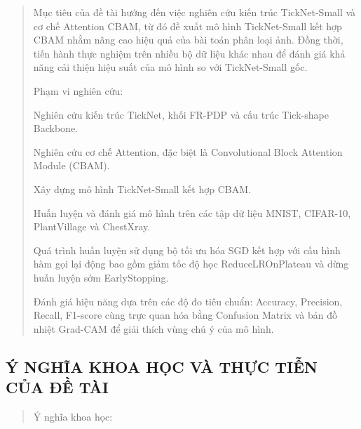 \documentclass[
]{article}
\begin{document}
\begin{quote}
Mục tiêu của đề tài hướng đến việc nghiên cứu kiến trúc TickNet-Small và
cơ chế Attention CBAM, từ đó đề xuất mô hình TickNet-Small kết hợp CBAM
nhằm nâng cao hiệu quả của bài toán phân loại ảnh. Đồng thời, tiến hành
thực nghiệm trên nhiều bộ dữ liệu khác nhau để đánh giá khả năng cải
thiện hiệu suất của mô hình so với TickNet-Small gốc.

Phạm vi nghiên cứu:

Nghiên cứu kiến trúc TickNet, khối FR-PDP và cấu trúc Tick-shape
Backbone.

Nghiên cứu cơ chế Attention, đặc biệt là Convolutional Block Attention
Module (CBAM).

Xây dựng mô hình TickNet-Small kết hợp CBAM.

Huấn luyện và đánh giá mô hình trên các tập dữ liệu MNIST, CIFAR-10,
PlantVillage và ChestXray.

Quá trình huấn luyện sử dụng bộ tối ưu hóa SGD kết hợp với cấu hình hàm
gọi lại động bao gồm giảm tốc độ học ReduceLROnPlateau và dừng huấn
luyện sớm EarlyStopping.

Đánh giá hiệu năng dựa trên các độ đo tiêu chuẩn: Accuracy, Precision,
Recall, F1-score cùng trực quan hóa bằng Confusion Matrix và bản đồ
nhiệt Grad-CAM để giải thích vùng chú ý của mô hình.
\end{quote}

\hypertarget{uxfd-nghux129a-khoa-hux1ecdc-vuxe0-thux1ef1c-tiux1ec5n-cux1ee7a-ux111ux1ec1-tuxe0i}{%
\subsection{Ý NGHĨA KHOA HỌC VÀ THỰC TIỄN CỦA ĐỀ
TÀI}\label{uxfd-nghux129a-khoa-hux1ecdc-vuxe0-thux1ef1c-tiux1ec5n-cux1ee7a-ux111ux1ec1-tuxe0i}}

\begin{quote}
Ý nghĩa khoa học:
\end{quote}
\end{document}
